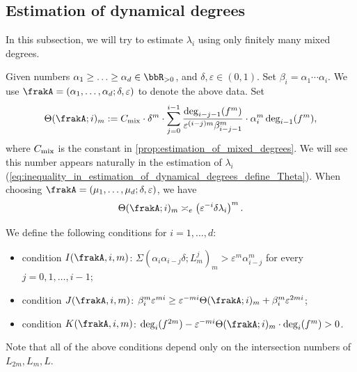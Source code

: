 \subsection{Estimation of dynamical degrees}

In this subsection, we will try to estimate $\lambda_i$ using only finitely many mixed degrees.


Given numbers $\alpha_1 \geq \ldots \geq \alpha_{d} \in \bbR_{>0}$, and $\delta, \varepsilon \in (0, 1)$.
Set $\beta_i = \alpha_1 \cdots \alpha_i$.
We use $\frakA = (\alpha_1, \ldots, \alpha_d; \delta, \varepsilon)$ to denote the above data.
Set
\[ \Theta(\frakA; i)_m := C_{\mix} \cdot \delta^m \cdot \sum_{j=0}^{i-1} \frac{\deg_{i-j-1}(f^{m})}{\varepsilon^{(i-j)m}\beta_{i-j-1}^m} \cdot \alpha_i^m \deg_{i-1}(f^{m}), \]
where $C_{\text{mix}}$ is the constant in \cref{prop:estimation_of_mixed_degrees}.
We will see this number appears naturally in the estimation of $\lambda_i$ (\cref{eq:inequality_in_estimation_of_dynamical_degrees_define_Theta}).
When choosing $\frakA = (\mu_1, \ldots, \mu_d; \delta, \varepsilon)$, we have
\[ \Theta(\frakA; i)_m \asymp_e \left( \varepsilon^{-i} \delta \lambda_i \right)^m. \]

\begin{definition}
	We define the following conditions for $i = 1, \ldots, d$:
	\begin{itemize}
		\item condition $I(\frakA,i,m)$: $\Sigma(\alpha_i \alpha_{i-j} \delta; L_m^{j})_{m} > \varepsilon^m \alpha_{i-j}^m$ for every $j = 0, 1, \ldots, i-1$;
		\item condition $J(\frakA,i,m)$: $\beta_i^m \varepsilon^{mi} \geq \varepsilon^{-mi} \Theta(\frakA; i)_m + \beta_i^m \varepsilon^{2mi}$;
		\item condition $K(\frakA,i,m)$: $\deg_i(f^{2m}) - \varepsilon^{-mi}\Theta(\frakA; i)_m \cdot \deg_i(f^{m}) > 0$.
	\end{itemize}
\end{definition}

Note that all of the above conditions depend only on the intersection numbers of $L_{2m}, L_m, L$.


